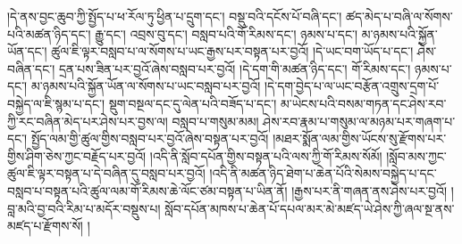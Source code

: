 །དེ་ནས་བྱང་ཆུབ་ཀྱི་སྤྱོད་པ་ཕ་རོལ་ཏུ་ཕྱིན་པ་དྲུག་དང་། བསྡུ་བའི་དངོས་པོ་བཞི་དང་། ཚད་མེད་པ་བཞི་ལ་སོགས་པའི་མཚན་ཉིད་དང་། རྒྱུ་དང་། འབྲས་བུ་དང་། བསླབ་པའི་གོ་རིམས་དང་། ཉམས་པ་དང་། མ་ཉམས་པའི་སྐྱོན་ཡོན་དང་། ཚུལ་ཇི་ལྟར་བསླབ་པ་ལ་སོགས་པ་ཡང་རྒྱས་པར་བསྟན་པར་བྱའོ། །དེ་ཡང་བག་ཡོད་པ་དང་། ཤེས་བཞིན་དང་། དྲན་པས་ཟིན་པར་བྱའོ་ཞེས་བསླབ་པར་བྱའོ། །དེ་དག་གི་མཚན་ཉིད་དང་། གོ་རིམས་དང་། ཉམས་པ་དང་། མ་ཉམས་པའི་སྐྱོན་ཡོན་ལ་སོགས་པ་ཡང་བསླབ་པར་བྱའོ། །དེ་དག་བྱེད་པ་ལ་ཡང་བརྩོན་འགྲུས་དྲག་པོ་བསྐྱེད་ལ་ཇི་སྙམ་པ་དང་། སྡུག་བསྔལ་དང་དུ་ལེན་པའི་བཟོད་པ་དང་། མ་ཡེངས་པའི་བསམ་གཏན་དང་ཤེས་རབ་ཀྱི་རང་བཞིན་མེད་པར་ཤེས་པར་བྱས་ལ། བསླབ་པ་གསུམ་མམ། ཤེས་རབ་རྣམ་པ་གསུམ་ལ་མཉམ་པར་གཞག་པ་དང་། སྤྱོད་ལམ་གྱི་ཚུལ་གྱིས་བསླབ་པར་བྱའོ་ཞེས་བསྟན་པར་བྱའོ། །མཐར་སྨོན་ལམ་གྱིས་ཡོངས་སུ་རྫོགས་པར་གྱིས་ཤིག་ཅེས་ཀྱང་བརྗོད་པར་བྱའོ། །འདི་ནི་སློབ་དཔོན་གྱིས་བསྟན་པའི་ལས་ཀྱི་གོ་རིམས་སོམོ། །སློབ་མས་ཀྱང་ཚུལ་ཇི་ལྟར་བསྟན་པ་དེ་བཞིན་དུ་བསླབ་པར་བྱའོ། །འདི་ནི་མཚན་ཉིད་ཐེག་པ་ཆེན་པོའི་སེམས་བསྐྱེད་པ་དང་བསླབ་པ་བསྟན་པའི་ཚུལ་ལམ་གོ་རིམས་ཆེ་ལོང་ཙམ་བསྟན་པ་ཡིན་ནོ། །རྒྱས་པར་ནི་གཞན་ནས་ཤེས་པར་བྱའོ། །བླ་མའི་བྱ་བའི་རིམ་པ་མདོར་བསྡུས་པ། སློབ་དཔོན་མཁས་པ་ཆེན་པོ་དཔལ་མར་མེ་མཛད་ཡེ་ཤེས་ཀྱི་ཞལ་སྔ་ནས་མཛད་པ་རྫོགས་སོ། ། 